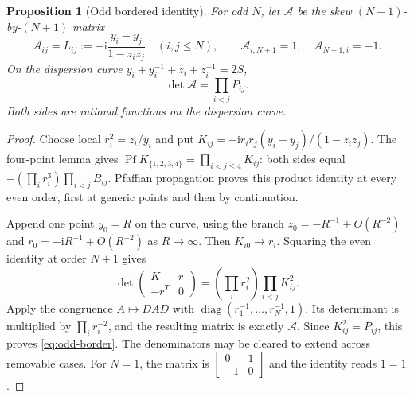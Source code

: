 \documentclass[11pt]{article}
\numberwithin{equation}{section}
\newtheorem{proposition}[theorem]{Proposition}
\theoremstyle{remark}\newtheorem{remark}[theorem]{Remark}
\DeclareMathOperator{\Pf}{Pf}
\newcommand{\ii}{\mathrm i}
\begin{document}
\begin{proposition}[Odd bordered identity]\label{prop:complete-product}
\label{prop:local-determinant-coefficient}
For odd $N$, let $\mathcal A$ be the skew $(N+1)$-by-$(N+1)$
matrix
\[
 \mathcal A_{ij}=L_{ij}:=-\ii\frac{y_i-y_j}{1-z_i z_j}
 \quad(i,j\le N),\qquad
 \mathcal A_{i,N+1}=1,\quad \mathcal A_{N+1,i}=-1.
\]
On the dispersion curve $y_i+y_i^{-1}+z_i+z_i^{-1}=2S$,
\begin{equation}\label{eq:odd-border}
 \det\mathcal A=\prod_{i<j}P_{ij}.
\end{equation}
Both sides are rational functions on the dispersion curve.
\end{proposition}
\begin{proof}
Choose local $r_i^2=z_i/y_i$ and put
$K_{ij}=-\ii r_i r_j(y_i-y_j)/(1-z_i z_j)$.
The four-point lemma gives
$\Pf K_{\{1,2,3,4\}}=\prod_{i<j\le4}K_{ij}$:
both sides equal $-(\prod_i r_i^3)\prod_{i<j}B_{ij}$.
Pfaffian propagation proves this product identity at every even
order, first at generic points and then by continuation.

Append one point $y_0=R$ on the curve, using the branch
$z_0=-R^{-1}+O(R^{-2})$ and
$r_0=-\ii R^{-1}+O(R^{-2})$ as $R\to\infty$.
Then $K_{i0}\to r_i$.
Squaring the even identity at order $N+1$ gives
\[
 \det\begin{pmatrix}K&r\\-r^T&0\end{pmatrix}
       =\left(\prod_i r_i^2\right)\prod_{i<j}K_{ij}^2.
\]
Apply the congruence $A\mapsto DAD$ with
$\operatorname{diag}(r_1^{-1},\ldots,r_N^{-1},1)$.
Its determinant is multiplied by $\prod_i r_i^{-2}$,
and the resulting matrix is exactly $\mathcal A$.
Since $K_{ij}^2=P_{ij}$, this proves \eqref{eq:odd-border}.
The denominators may be cleared to extend across removable cases.
For $N=1$, the matrix is $\left[\begin{smallmatrix}0&1\\-1&0\end{smallmatrix}\right]$
and the identity reads $1=1$.
\end{proof}
\end{document}
